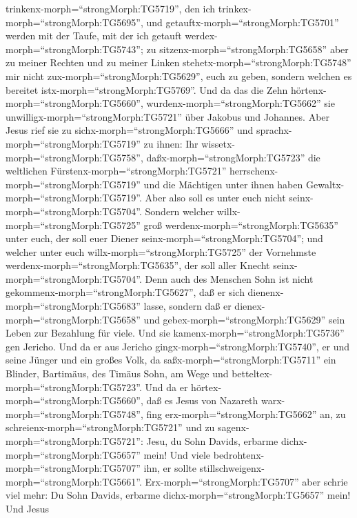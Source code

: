 trinkenx-morph=``strongMorph:TG5719'', den ich
trinkex-morph=``strongMorph:TG5695'', und
getauftx-morph=``strongMorph:TG5701'' werden mit der Taufe, mit der ich
getauft werdex-morph=``strongMorph:TG5743'';  zu
sitzenx-morph=``strongMorph:TG5658'' aber zu meiner Rechten und zu
meiner Linken stehetx-morph=``strongMorph:TG5748'' mir nicht
zux-morph=``strongMorph:TG5629'', euch zu geben, sondern welchen es
bereitet istx-morph=``strongMorph:TG5769''.  Und da das die
Zehn hörtenx-morph=``strongMorph:TG5660'',
wurdenx-morph=``strongMorph:TG5662'' sie
unwilligx-morph=``strongMorph:TG5721'' über Jakobus und Johannes.
 Aber Jesus rief sie zu sichx-morph=``strongMorph:TG5666''
und sprachx-morph=``strongMorph:TG5719'' zu ihnen: Ihr
wissetx-morph=``strongMorph:TG5758'', daßx-morph=``strongMorph:TG5723''
die weltlichen Fürstenx-morph=``strongMorph:TG5721''
herrschenx-morph=``strongMorph:TG5719'' und die Mächtigen unter ihnen
haben Gewaltx-morph=``strongMorph:TG5719''.  Aber also soll
es unter euch nicht seinx-morph=``strongMorph:TG5704''. Sondern welcher
willx-morph=``strongMorph:TG5725'' groß
werdenx-morph=``strongMorph:TG5635'' unter euch, der soll euer Diener
seinx-morph=``strongMorph:TG5704'';  und welcher unter euch
willx-morph=``strongMorph:TG5725'' der Vornehmste
werdenx-morph=``strongMorph:TG5635'', der soll aller Knecht
seinx-morph=``strongMorph:TG5704''.  Denn auch des Menschen
Sohn ist nicht gekommenx-morph=``strongMorph:TG5627'', daß er sich
dienenx-morph=``strongMorph:TG5683'' lasse, sondern daß er
dienex-morph=``strongMorph:TG5658'' und
gebex-morph=``strongMorph:TG5629'' sein Leben zur Bezahlung für viele.
 Und sie kamenx-morph=``strongMorph:TG5736'' gen Jericho.
Und da er aus Jericho gingx-morph=``strongMorph:TG5740'', er und seine
Jünger und ein großes Volk, da saßx-morph=``strongMorph:TG5711'' ein
Blinder, Bartimäus, des Timäus Sohn, am Wege und
betteltex-morph=``strongMorph:TG5723''.  Und da er
hörtex-morph=``strongMorph:TG5660'', daß es Jesus von Nazareth
warx-morph=``strongMorph:TG5748'', fing erx-morph=``strongMorph:TG5662''
an, zu schreienx-morph=``strongMorph:TG5721'' und zu
sagenx-morph=``strongMorph:TG5721'': Jesu, du Sohn Davids, erbarme
dichx-morph=``strongMorph:TG5657'' mein!  Und viele
bedrohtenx-morph=``strongMorph:TG5707'' ihn, er sollte
stillschweigenx-morph=``strongMorph:TG5661''.
Erx-morph=``strongMorph:TG5707'' aber schrie viel mehr: Du Sohn Davids,
erbarme dichx-morph=``strongMorph:TG5657'' mein!  Und Jesus

